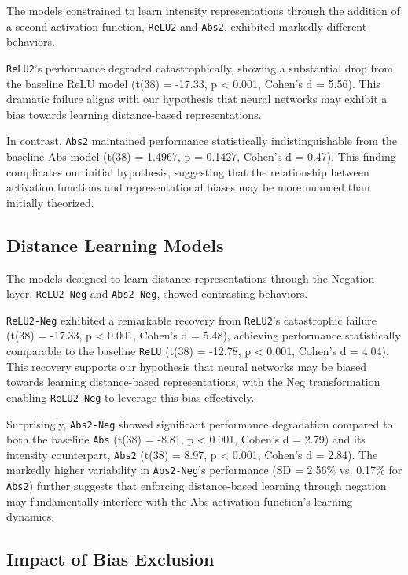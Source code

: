 The models constrained to learn intensity representations through the addition of a second activation function, \texttt{ReLU2} and \texttt{Abs2}, exhibited markedly different behaviors. 

\texttt{ReLU2}'s performance degraded catastrophically, showing a substantial drop from the baseline ReLU model (t(38) = -17.33, p < 0.001, Cohen's d = 5.56). This dramatic failure aligns with our hypothesis that neural networks may exhibit a bias towards learning distance-based representations. 

In contrast, \texttt{Abs2} maintained performance statistically indistinguishable from the baseline Abs model (t(38) = 1.4967, p = 0.1427, Cohen's d = 0.47). This finding complicates our initial hypothesis, suggesting that the relationship between activation functions and representational biases may be more nuanced than initially theorized.

\subsection{Distance Learning Models}

The models designed to learn distance representations through the Negation layer, \texttt{ReLU2-Neg} and \texttt{Abs2-Neg}, showed contrasting behaviors.

\texttt{ReLU2-Neg} exhibited a remarkable recovery from \texttt{ReLU2}'s catastrophic failure (t(38) = -17.33, p < 0.001, Cohen's d = 5.48), achieving performance statistically comparable to the baseline \texttt{ReLU} (t(38) = -12.78, p < 0.001, Cohen's d = 4.04). This recovery supports our hypothesis that neural networks may be biased towards learning distance-based representations, with the Neg transformation enabling \texttt{ReLU2-Neg} to leverage this bias effectively.

Surprisingly, \texttt{Abs2-Neg} showed significant performance degradation compared to both the baseline \texttt{Abs} (t(38) = -8.81, p < 0.001, Cohen's d = 2.79) and its intensity counterpart, \texttt{Abs2} (t(38) = 8.97, p < 0.001, Cohen's d = 2.84). The markedly higher variability in \texttt{Abs2-Neg}'s performance (SD = 2.56\% vs. 0.17\% for \texttt{Abs2}) further suggests that enforcing distance-based learning through negation may fundamentally interfere with the Abs activation function's learning dynamics.

\subsection{Impact of Bias Exclusion}

